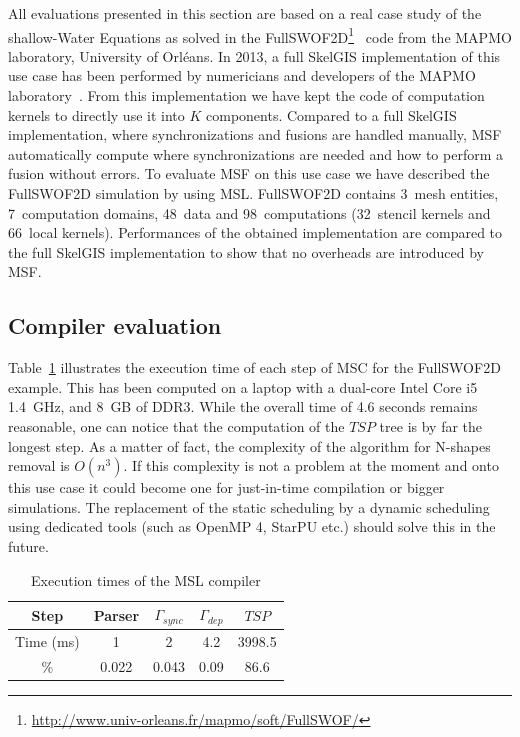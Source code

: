 All evaluations presented in this section are based on a real case study of the shallow-Water Equations as solved in the FullSWOF2D\footnote{\url{http://www.univ-orleans.fr/mapmo/soft/FullSWOF/}}~\cite{Ferrari2004,CPE:CPE3494} code from the MAPMO laboratory, University of Orl\'eans.
In 2013, a full SkelGIS implementation of this use case has been performed by numericians and developers of the MAPMO laboratory~\cite{CPE:CPE3494,cordier2013fullswof,coullon:hal-00832660}. From this implementation we have kept the code of computation kernels to directly use it into $K$ components. Compared to a full SkelGIS implementation, where synchronizations and fusions are handled manually, MSF automatically compute where synchronizations are needed and how to perform a fusion without errors. To evaluate MSF on this use case we have described the FullSWOF2D simulation by using MSL. FullSWOF2D contains 3~mesh entities, 7~computation domains, 48~data and 98~computations (32~stencil kernels and 66~local kernels). Performances of the obtained implementation are compared to the full SkelGIS implementation to show that no overheads are introduced by MSF.

\subsection{Compiler evaluation}

Table~\ref{fig:exectime} illustrates the execution time of each step of MSC for the FullSWOF2D example.
This has been computed on a laptop with a dual-core Intel Core i5 1.4~GHz, and 8~GB of DDR3.
While the overall time of 4.6 seconds remains reasonable, one can notice that the computation of the $TSP$ tree is by far the longest step.
As a matter of fact, the complexity of the algorithm for N-shapes removal is $O(n^3)$.
If this complexity is not a problem at the moment and onto this use case it could become one for just-in-time compilation or bigger simulations. The replacement of the static scheduling by a dynamic scheduling using dedicated tools (such as OpenMP 4, StarPU etc.) should solve this in the future.

\begin{table}[!h]
 \begin{center}
 \begin{tabular}{|c|c|c|c|c|}
   Step & Parser & $\Gamma_{sync}$ & $\Gamma_{dep}$ & $TSP$\\
   \hline
   Time (ms) & 1 & 2 & 4.2 & 3998.5\\
   \hline
   \% & 0.022 & 0.043 & 0.09 & 86.6\\
 \end{tabular}
\caption{Execution times of the MSL compiler}
\label{fig:exectime}
 \end{center}
\end{table}

